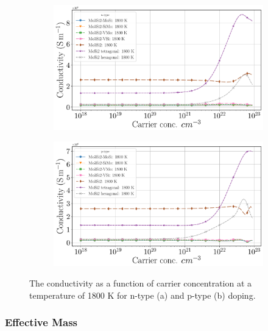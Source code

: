 \documentclass[7.5pt]{article}
\theoremstyle{plain}
\theoremstyle{definition}
\newcommand{\<}{\langle}
\renewcommand{\>}{\rangle}
\begin{document}
\begin{figure}
\centering
\begin{subfigure}{.5\textwidth}
  \centering
  \includegraphics[width=\linewidth]{allmats_C_doping_temp_n}
  \caption{}
  \label{fig:sub1}
\end{subfigure}%
\begin{subfigure}{.5\textwidth}
  \centering
  \includegraphics[width=\linewidth]{allmats_C_doping_temp_p}
  \caption{}
  \label{fig:sub2}
\end{subfigure}
\caption{The conductivity as a function of carrier concentration at a temperature of 1800 K for n-type (a) and p-type (b) doping.}
\label{fig:C-Doping}
\end{figure}

\clearpage
\subsubsection{Effective Mass}

\end{document}
